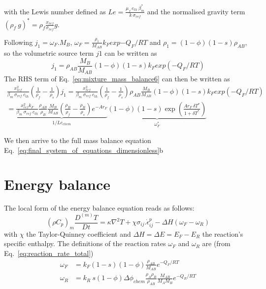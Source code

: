 \documentclass[]{scrreprt}
\begin{document}
with the Lewis number defined as $Le = \frac{\mu_f\:c_{th}\:\beta^*_m}{k \: \sigma_{ref}}$ and the normalised gravity term $(\rho_f\:g)^*=\rho_f \frac{x_{ref}}{\sigma_{ref}}g$.

Following \citep[][appendix A]{Alevizos2014}
$j_1 = \omega_F.M_B$, $\omega_F=\frac{\rho_1}{M_{AB}}k_F exp{-Q_F/RT}$ and $\rho_1=(1-\phi)(1-s)\rho_{AB}$, so the volumetric source term $j1$ can be written as
\begin{equation}
  \label{eq:j1_a}
  j_1 =\rho_{AB}\frac{M_B}{M_{AB}}(1-\phi)(1-s) k_F exp{(-Q_F/RT)}
\end{equation}
The RHS term of Eq.~\ref{eq:mixture_mass_balance6} can then be written as
\begin{multline}
  \label{eq:mixture_mass_balance_rhs}
  \frac{x^2_{ref}}{\beta_m\:\sigma_{ref}\:c_{th}} \left(\frac{1}{\rho_f} - \frac{1}{\rho_s}\right)j_1 = \frac{x^2_{ref}}{\beta_m\:\sigma_{ref}\:c_{th}} \left(\frac{1}{\rho_f} - \frac{1}{\rho_s}\right)\rho_{AB}\frac{M_B}{M_{AB}}(1-\phi)(1-s) k_F exp{(-Q_F/RT)} \\
  = \underbrace{\frac{x^2_{ref}k_F }{\beta_m\:\sigma_{ref}\:c_{th}} \frac{\rho_{AB}}{\rho_B}\frac{M_B}{M_{AB}}\left(\frac{\rho_B}{\rho_f} - \frac{\rho_B}{\rho_s}\right)e^{-Ar_F}}_{1/Le_{chem}} \underbrace{(1-\phi)(1-s) \exp{\left( \frac{Ar_F \:\delta T^*}{1+\delta T^*} \right)}}_{\omega^*_F }
\end{multline}

We then arrive to the full mass balance equation Eq.~\ref{eq:final_system_of_equations_dimensionless}b

\section{Energy balance}
\label{sec:energy_balance}
The local form of the energy balance equation reads as follows:
\begin{equation}
  \label{eq:energy_balance}
  (\rho C_p)_m \frac{D^{(m)}T}{Dt} = \kappa \nabla^2 T + \chi \sigma_{ij}.\dot{\epsilon}^{p}_{ij} - \Delta H (\omega_F - \omega_R)
\end{equation}
with $\chi$ the Taylor-Quinney coefficient and $\Delta H=\Delta E=E_F-E_R$ the reaction's specific enthalpy.
The definitions of the reaction rates $\omega_F$ and $\omega_R$ are (from Eq.~\ref{eq:reaction_rate_total})
\begin{subequations}
 \label{eq:reaction_rates}
 \begin{align}
 \omega_F &= k_F (1 - s)(1 - \phi)\frac{\rho_{AB}}{M_{AB}}  e^{-Q_F/RT} \\
 \omega_R &= k_R \:s  (1 - \phi)  \Delta \phi_{chem} \frac{\rho_{A} \rho_{B}}{\rho_{AB}} \frac{M_{AB}}{M_A M_B}  e^{-Q_R/RT}
  \end{align}
\end{subequations}
\end{document}
